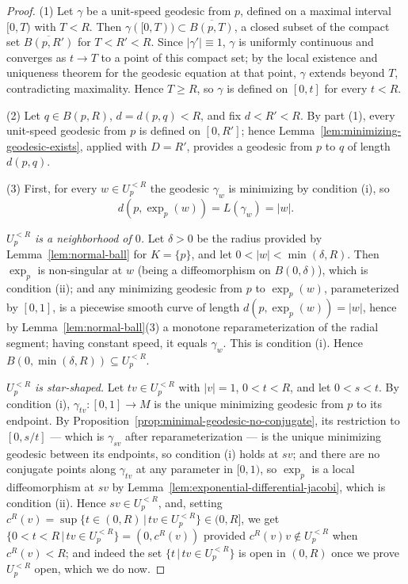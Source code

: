 \begin{proof}
(1) Let $\gamma$ be a unit-speed geodesic from $p$, defined on a
maximal interval $[0,T)$ with $T<R$. Then
$\gamma([0,T))\subset \overline{B(p,T)}$, a closed subset of the
compact set $\overline{B(p,R')}$ for $T<R'<R$. Since $|\gamma'|
\equiv1$, $\gamma$ is uniformly continuous and converges as $t\to
T$ to a point of this compact set; by the local existence and
uniqueness theorem for the geodesic equation at that point,
$\gamma$ extends beyond $T$, contradicting maximality. Hence
$T\ge R$, so $\gamma$ is defined on $[0,t]$ for every $t<R$.

(2) Let $q\in B(p,R)$, $d=d(p,q)<R$, and fix $d<R'<R$. By part
(1), every unit-speed geodesic from $p$ is defined on $[0,R']$;
hence Lemma~\ref{lem:minimizing-geodesic-exists}, applied with
$D=R'$, provides a geodesic from $p$ to $q$ of length $d(p,q)$.

(3) First, for every $w\in U_p^{<R}$ the geodesic $\gamma_w$ is
minimizing by condition (i), so
$$d\left(p,\exp_p(w)\right)=L(\gamma_w)=|w|.$$

\emph{$U_p^{<R}$ is a neighborhood of $0$.} Let $\delta>0$ be the
radius provided by Lemma~\ref{lem:normal-ball} for $K=\{p\}$, and
let $0<|w|<\min(\delta,R)$. Then $\exp_p$ is non-singular at $w$
(being a diffeomorphism on $B(0,\delta)$), which is condition
(ii); and any minimizing geodesic from $p$ to $\exp_p(w)$,
parameterized by $[0,1]$, is a piecewise smooth curve of length
$d(p,\exp_p(w))=|w|$, hence by
Lemma~\ref{lem:normal-ball}(3) a monotone reparameterization of
the radial segment; having constant speed, it equals $\gamma_w$.
This is condition (i). Hence
$B(0,\min(\delta,R))\subseteq U_p^{<R}$.

\emph{$U_p^{<R}$ is star-shaped.} Let $tv\in U_p^{<R}$ with
$|v|=1$, $0<t<R$, and let $0<s<t$. By condition (i),
$\gamma_{tv}\colon[0,1]\to M$ is the unique minimizing geodesic
from $p$ to its endpoint. By
Proposition~\ref{prop:minimal-geodesic-no-conjugate}, its
restriction to $[0,s/t]$ --- which is $\gamma_{sv}$ after
reparameterization --- is the unique minimizing geodesic between
its endpoints, so condition (i) holds at $sv$; and there are no
conjugate points along $\gamma_{tv}$ at any parameter in $[0,1)$,
so $\exp_p$ is a local diffeomorphism at $sv$ by
Lemma~\ref{lem:exponential-differential-jacobi}, which is
condition (ii). Hence $sv\in U_p^{<R}$, and, setting
$c^R(v)=\sup\{t\in(0,R)\,|\,tv\in U_p^{<R}\}\in(0,R]$, we get
$\{0<t<R\,|\,tv\in U_p^{<R}\}=(0,c^R(v))$ provided $c^R(v)v\notin
U_p^{<R}$ when $c^R(v)<R$; and indeed the set $\{t\,|\,tv\in
U_p^{<R}\}$ is open in $(0,R)$ once we prove $U_p^{<R}$ open,
which we do now.


\end{proof}
